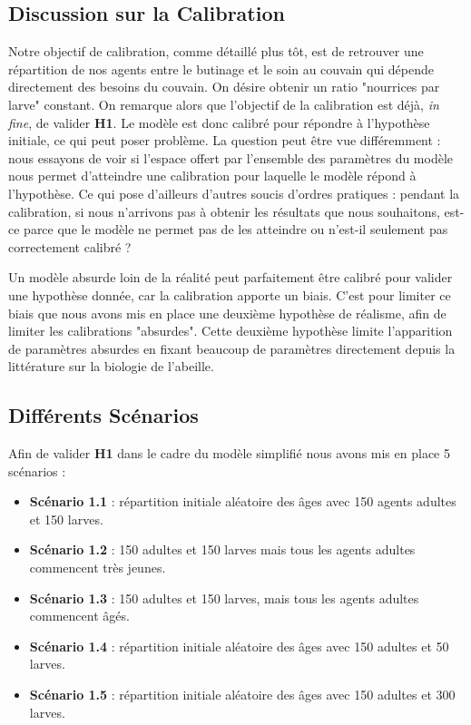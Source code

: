 		\subsection{Discussion sur la Calibration}
		
		Notre objectif de calibration, comme détaillé plus tôt, est de retrouver une répartition de nos agents entre le butinage et le soin au couvain qui dépende directement des besoins du couvain. On désire obtenir un ratio "nourrices par larve" constant. On remarque alors que l'objectif de la calibration est déjà, \textit{in fine}, de valider \textbf{H1}. Le modèle est donc calibré pour répondre à l'hypothèse initiale, ce qui peut poser problème. La question peut être vue différemment : nous essayons de voir si l'espace offert par l'ensemble des paramètres du modèle nous permet d'atteindre une calibration pour laquelle le modèle répond à l'hypothèse. Ce qui pose d'ailleurs d'autres soucis d'ordres pratiques : pendant la calibration, si nous n'arrivons pas à obtenir les résultats que nous souhaitons, est-ce parce que le modèle ne permet pas de les atteindre ou n'est-il seulement pas correctement calibré ?
		
		Un modèle absurde loin de la réalité peut parfaitement être calibré pour valider une hypothèse donnée, car la calibration apporte un biais. C'est pour limiter ce biais que nous avons mis en place une deuxième hypothèse de réalisme, afin de limiter les calibrations "absurdes". Cette deuxième hypothèse limite l'apparition de paramètres absurdes en fixant beaucoup de paramètres directement depuis la littérature sur la biologie de l'abeille.
			
	\subsection{Différents Scénarios}
			
			Afin de valider \textbf{H1} dans le cadre du modèle simplifié nous avons mis en place 5 scénarios :
			\begin{itemize}
				\item \textbf{Scénario 1.1} : répartition initiale aléatoire des âges avec 150 agents adultes et 150 larves.
				\item \textbf{Scénario 1.2} : 150 adultes et 150 larves mais tous les agents adultes commencent très jeunes.
				\item \textbf{Scénario 1.3} : 150 adultes et 150 larves, mais tous les agents adultes commencent âgés.
				\item \textbf{Scénario 1.4} : répartition initiale aléatoire des âges avec 150 adultes et 50 larves.
				\item \textbf{Scénario 1.5} : répartition initiale aléatoire des âges avec 150 adultes et 300 larves.
			\end{itemize}
			
